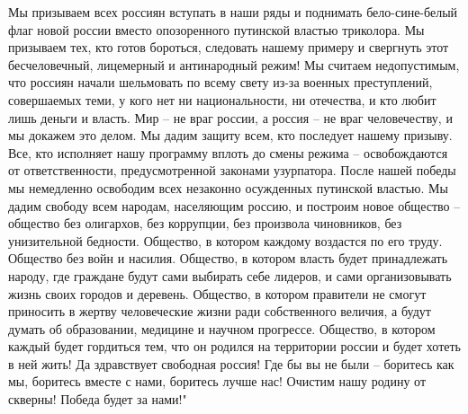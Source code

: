 Мы призываем всех россиян вступать в наши ряды и поднимать бело-сине-белый флаг новой россии вместо опозоренного путинской властью триколора.
Мы призываем тех, кто готов бороться, следовать нашему примеру и свергнуть этот бесчеловечный, лицемерный и антинародный режим!
Мы считаем недопустимым, что россиян начали шельмовать по всему свету из-за военных преступлений, совершаемых теми, у кого нет ни национальности, ни отечества, и кто любит лишь деньги и власть.
Мир – не враг россии, а россия – не враг человечеству, и мы докажем это делом.
Мы дадим защиту всем, кто последует нашему призыву.
Все, кто исполняет нашу программу вплоть до смены режима – освобождаются от ответственности, предусмотренной законами узурпатора.
После нашей победы мы немедленно освободим всех незаконно осужденных путинской властью.
Мы дадим свободу всем народам, населяющим россию, и построим новое общество – общество без олигархов, без коррупции, без произвола чиновников, без унизительной бедности.
Общество, в котором каждому воздастся по его труду. Общество без войн и насилия.
Общество, в котором власть будет принадлежать народу, где граждане будут сами выбирать себе лидеров, и сами организовывать жизнь своих городов и деревень.
Общество, в котором правители не смогут приносить в жертву человеческие жизни ради собственного величия, а будут думать об образовании, медицине и научном прогрессе.
Общество, в котором каждый будет гордиться тем, что он родился на территории россии и будет хотеть в ней жить!
Да здравствует свободная россия!
Где бы вы не были – боритесь как мы, боритесь вместе с нами, боритесь лучше нас!
Очистим нашу родину от скверны! Победа будет за нами!"
